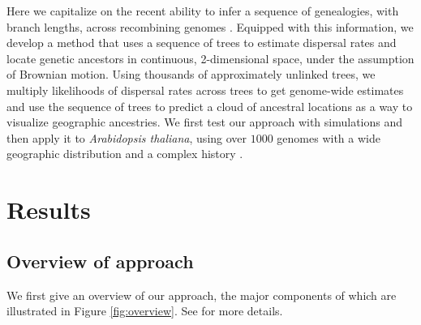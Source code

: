 \documentclass[12pt]{article}
\begin{document}
Here we capitalize on the recent ability to infer a sequence of genealogies, with branch lengths, across recombining genomes \citep{rasmussen2014genome,speidel2019method,wohns2021unified}.
Equipped with this information, we develop a method that uses a sequence of trees to estimate dispersal rates and locate genetic ancestors in continuous, 2-dimensional space, under the assumption of Brownian motion.
Using thousands of approximately unlinked trees, we multiply likelihoods of dispersal rates across trees to get genome-wide estimates and use the sequence of trees to predict a cloud of ancestral locations as a way to visualize geographic ancestries.
We first test our approach with simulations and then apply it to \textit{Arabidopsis thaliana}, using over $1000$  genomes with a wide geographic distribution \citep{alonso2016} and a complex history \citep{fulgione2018archaic,hsu2019postglacial}.

\section*{Results}

\subsection*{Overview of approach} 

We first give an overview of our approach, the major components of which are illustrated in Figure \ref{fig:overview}.
See  for more details.

\end{document}
